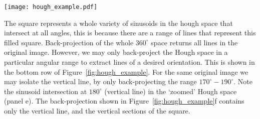 \begin{sidewaysfigure}
\centering
\texttt{[image: hough\_example.pdf]}
\caption[Example Hough Transform]{(a) An image with a number of lines of varying orientation and intensity. (b) The Hough transform of the image in $(r, \theta)$ space. The multiple intersection points at $90^{\circ}$ and a variety of radii correspond to the multiple horizontal lines in the original image. There are also intersection points at $135^{\circ}$ (diagonal line in original image) and $180^{\circ}$ (vertical) line. (c) The back projected Hough transform, recovering all features in the original image. The bottom row (d)-(f) show the same as the top row, expect that the back-projection is chosen over a region in hough space that only contains the vertical line. In this way only the vertical line is recovered and the remaining features are not recovered.}
\label{fig:hough_example}
\end{sidewaysfigure}
The square represents a whole variety of sinusoids in the hough space that intersect at all angles, this is because there are a range of lines that represent this filled square. Back-projection of the whole $360^{\circ}$ space returns all lines in the original image. However, we may only back-project the Hough space in a particular angular range to extract lines of a desired orientation. This is shown in the bottom row of Figure~\ref{fig:hough_example}. For the same original image we may isolate the vertical line, by only back-projecting the range $170^{\circ}-190^{\circ}$. Note the sinusoid intersection at $180^{\circ}$ (vertical line) in the `zoomed' Hough space (panel e). The back-projection shown in Figure~\ref{fig:hough_example}f contains only the vertical line, and the vertical sections of the square.
%

